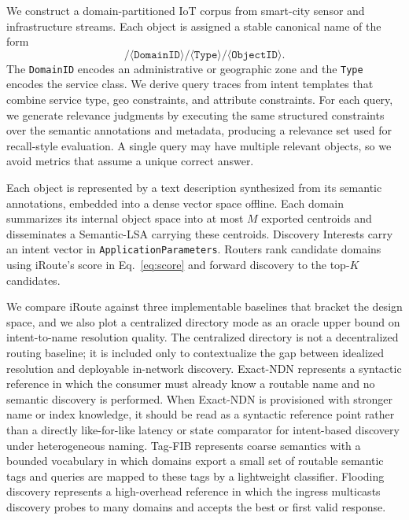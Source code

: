 \documentclass[journal]{IEEEtran}
\newcommand{\sysname}{iRoute}
\begin{document}
We construct a domain-partitioned IoT corpus from smart-city sensor and infrastructure streams.
Each object is assigned a stable canonical name of the form
\[
\texttt{/}\langle \texttt{DomainID}\rangle\texttt{/}\langle \texttt{Type}\rangle\texttt{/}\langle \texttt{ObjectID}\rangle.
\]
The \texttt{DomainID} encodes an administrative or geographic zone and the \texttt{Type} encodes the service class.
We derive query traces from intent templates that combine service type, geo constraints, and attribute constraints.
For each query, we generate relevance judgments by executing the same structured constraints over the semantic annotations and metadata, producing a relevance set used for recall-style evaluation.
A single query may have multiple relevant objects, so we avoid metrics that assume a unique correct answer.

Each object is represented by a text description synthesized from its semantic annotations, embedded into a dense vector space offline.
Each domain summarizes its internal object space into at most $M$ exported centroids and disseminates a Semantic-LSA carrying these centroids.
Discovery Interests carry an intent vector in \texttt{ApplicationParameters}.
Routers rank candidate domains using \sysname{}'s score in Eq.~\ref{eq:score} and forward discovery to the top-$K$ candidates.

We compare \sysname{} against three implementable baselines that bracket the design space, and we also plot a centralized directory mode as an oracle upper bound on intent-to-name resolution quality.
The centralized directory is not a decentralized routing baseline; it is included only to contextualize the gap between idealized resolution and deployable in-network discovery.
Exact-NDN represents a syntactic reference in which the consumer must already know a routable name and no semantic discovery is performed.
When Exact-NDN is provisioned with stronger name or index knowledge, it should be read as a syntactic reference point rather than a directly like-for-like latency or state comparator for intent-based discovery under heterogeneous naming.
Tag-FIB represents coarse semantics with a bounded vocabulary in which domains export a small set of routable semantic tags and queries are mapped to these tags by a lightweight classifier.
Flooding discovery represents a high-overhead reference in which the ingress multicasts discovery probes to many domains and accepts the best or first valid response.
\end{document}
